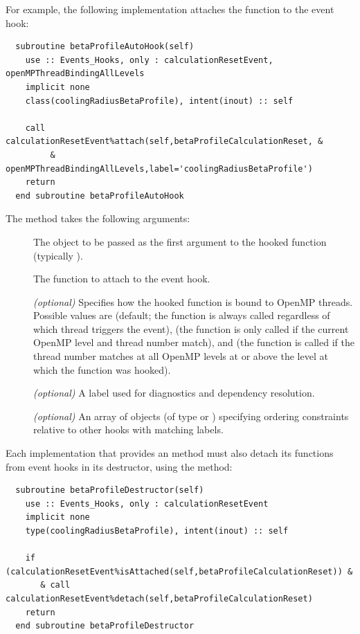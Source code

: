 For example, the following  implementation attaches the  function to the  event hook:

\begin{lstlisting}
  subroutine betaProfileAutoHook(self)
    use :: Events_Hooks, only : calculationResetEvent, openMPThreadBindingAllLevels
    implicit none
    class(coolingRadiusBetaProfile), intent(inout) :: self

    call calculationResetEvent%attach(self,betaProfileCalculationReset, &
         & openMPThreadBindingAllLevels,label='coolingRadiusBetaProfile')
    return
  end subroutine betaProfileAutoHook
\end{lstlisting}

The  method takes the following arguments:
\begin{description}
\item[] The object to be passed as the first argument to the hooked function (typically ).
\item[] The function to attach to the event hook.
\item[] \emph{(optional)} Specifies how the hooked function is bound to OpenMP threads. Possible values are  (default; the function is always called regardless of which thread triggers the event),  (the function is only called if the current OpenMP level and thread number match), and  (the function is called if the thread number matches at all OpenMP levels at or above the level at which the function was hooked).
\item[] \emph{(optional)} A label used for diagnostics and dependency resolution.
\item[] \emph{(optional)} An array of  objects (of type  or ) specifying ordering constraints relative to other hooks with matching labels.
\end{description}

Each  implementation that provides an  method must also detach its functions from event hooks in its destructor, using the  method:

\begin{lstlisting}
  subroutine betaProfileDestructor(self)
    use :: Events_Hooks, only : calculationResetEvent
    implicit none
    type(coolingRadiusBetaProfile), intent(inout) :: self

    if (calculationResetEvent%isAttached(self,betaProfileCalculationReset)) &
       & call calculationResetEvent%detach(self,betaProfileCalculationReset)
    return
  end subroutine betaProfileDestructor
\end{lstlisting}

